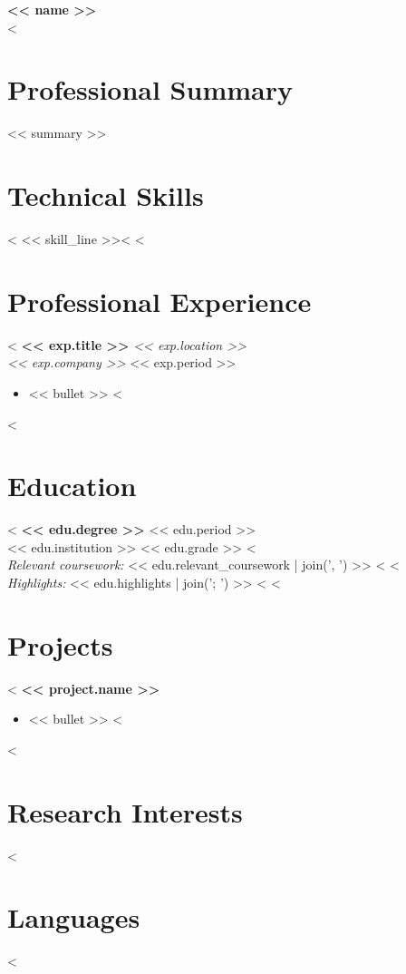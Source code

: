 \documentclass[11pt,a4paper]{article}
\newcommand{\entryheader}[4]{%
    \textbf{#1} \hfill \textit{#2}\\
    \textit{#3} \hfill #4
}
\begin{document}
\begin{center}
    {\LARGE\bfseries << name >>}\\[4pt]
    <%
\end{center}

\section{Professional Summary}
<< summary >>

\section{Technical Skills}
<%
<< skill_line >><%
<%

\section{Professional Experience}
<%
\entryheader{ << exp.title >> }{ << exp.location >> }{ << exp.company >> }{ << exp.period >> }
\begin{itemize}[leftmargin=*,nosep,topsep=2pt]
    <%
    \item << bullet >>
    <%
\end{itemize}
<%

\section{Education}
<%
\textbf{ << edu.degree >> } \hfill << edu.period >>\\
<< edu.institution >> \hfill << edu.grade >>
<%
\\\textit{Relevant coursework:} << edu.relevant_coursework | join(', ') >>
<%
<%
\\\textit{Highlights:} << edu.highlights | join('; ') >>
<%
<%

\section{Projects}
<%
\textbf{ << project.name >> }
\begin{itemize}[leftmargin=*,nosep,topsep=2pt]
    <%
    \item << bullet >>
    <%
\end{itemize}
<%

\section{Research Interests}
<%

\section{Languages}
<%
\end{document}
